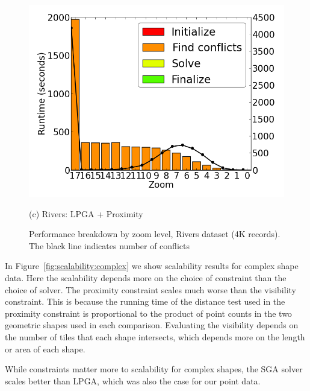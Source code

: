 \begin{figure}[tb]
\begin{minipage}{0.329\linewidth}
    \centerline{\includegraphics[width=1.0\linewidth]{./figs/prelim_lin_30k_uswaterway_lp_B.png}}
    \centerline{(c) Rivers: LPGA + Proximity}
  \end{minipage}
  \vspace{-0ex}
  \caption{Performance breakdown by zoom level, Rivers dataset (4K records). The black line indicates number of conflicts} \label{fig:performance:complex}
  \vspace{-2ex}
\end{figure}



In Figure~\ref{fig:scalability:complex} we show scalability results for complex shape data. Here the scalability depends more on the choice of constraint than the choice of solver. The proximity constraint scales much worse than the visibility constraint. This is because the running time of the distance test used in the proximity constraint is proportional to the product of point counts in the two geometric shapes used in each comparison. Evaluating the visibility depends on the number of tiles that each shape intersects, which depends more on the length or area of each shape. 

While constraints matter more to scalability for complex shapes, the SGA solver scales better than LPGA, which was also the case for our point data.

